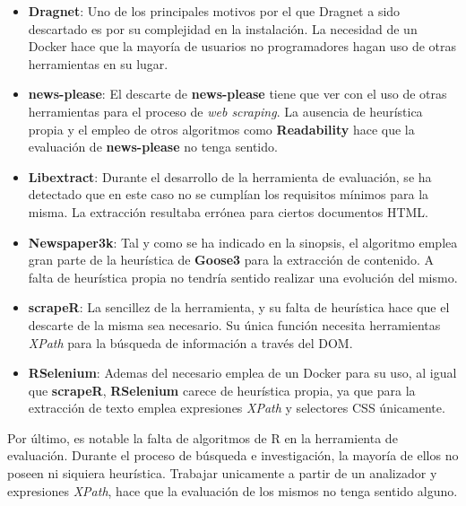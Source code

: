 \begin{itemize}
  \item \textbf{Dragnet}: Uno de los principales motivos por el que Dragnet a sido descartado es por su 
  complejidad en la instalación. La necesidad de un Docker hace que la mayoría de usuarios no programadores 
  hagan uso de otras herramientas en su lugar.
  \item \textbf{news-please}: El descarte de \textbf{news-please} tiene que ver con el uso de otras
  herramientas para el proceso de \emph{web scraping}. La ausencia de heurística propia y el empleo de otros 
  algoritmos como \textbf{Readability} hace que la evaluación de \textbf{news-please} no tenga sentido.
  \item \textbf{Libextract}: Durante el desarrollo de la herramienta de evaluación, se ha detectado que en
  este caso no se cumplían los requisitos mínimos para la misma. La extracción resultaba errónea para
  ciertos documentos HTML.
  \item \textbf{Newspaper3k}: Tal y como se ha indicado en la sinopsis, el algoritmo emplea gran parte de
  la heurística de \textbf{Goose3} para la extracción de contenido. A falta de heurística propia no tendría
  sentido realizar una evolución del mismo.
  \item \textbf{scrapeR}: La sencillez de la herramienta, y su falta de heurística hace que el descarte 
  de la misma sea necesario. Su única función necesita herramientas \emph{XPath} para la búsqueda de 
  información a través del DOM.
  \item \textbf{RSelenium}: Ademas del necesario emplea de un Docker para su uso, al igual que 
  \textbf{scrapeR}, \textbf{RSelenium} carece de heurística propia, ya que para la extracción de texto 
  emplea expresiones \emph{XPath} y selectores CSS únicamente.
\end{itemize}

Por último, es notable la falta de algoritmos de R en la herramienta de evaluación. Durante el proceso de
búsqueda e investigación, la mayoría de ellos no poseen ni siquiera heurística. Trabajar unicamente a 
partir de un analizador y expresiones \emph{XPath}, hace que la evaluación de los mismos no tenga sentido 
alguno.

